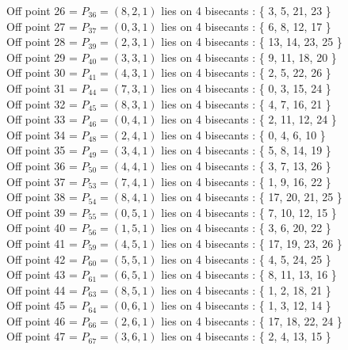 \documentclass{article}
\begin{document}
{Off point 26 = $P_{36} = ( 8, 2, 1 )$ lies on 4 bisecants : \{ 3, 5, 21, 23 \}\\
Off point 27 = $P_{37} = ( 0, 3, 1 )$ lies on 4 bisecants : \{ 6, 8, 12, 17 \}\\
Off point 28 = $P_{39} = ( 2, 3, 1 )$ lies on 4 bisecants : \{ 13, 14, 23, 25 \}\\
Off point 29 = $P_{40} = ( 3, 3, 1 )$ lies on 4 bisecants : \{ 9, 11, 18, 20 \}\\
Off point 30 = $P_{41} = ( 4, 3, 1 )$ lies on 4 bisecants : \{ 2, 5, 22, 26 \}\\
Off point 31 = $P_{44} = ( 7, 3, 1 )$ lies on 4 bisecants : \{ 0, 3, 15, 24 \}\\
Off point 32 = $P_{45} = ( 8, 3, 1 )$ lies on 4 bisecants : \{ 4, 7, 16, 21 \}\\
Off point 33 = $P_{46} = ( 0, 4, 1 )$ lies on 4 bisecants : \{ 2, 11, 12, 24 \}\\
Off point 34 = $P_{48} = ( 2, 4, 1 )$ lies on 4 bisecants : \{ 0, 4, 6, 10 \}\\
Off point 35 = $P_{49} = ( 3, 4, 1 )$ lies on 4 bisecants : \{ 5, 8, 14, 19 \}\\
Off point 36 = $P_{50} = ( 4, 4, 1 )$ lies on 4 bisecants : \{ 3, 7, 13, 26 \}\\
Off point 37 = $P_{53} = ( 7, 4, 1 )$ lies on 4 bisecants : \{ 1, 9, 16, 22 \}\\
Off point 38 = $P_{54} = ( 8, 4, 1 )$ lies on 4 bisecants : \{ 17, 20, 21, 25 \}\\
Off point 39 = $P_{55} = ( 0, 5, 1 )$ lies on 4 bisecants : \{ 7, 10, 12, 15 \}\\
Off point 40 = $P_{56} = ( 1, 5, 1 )$ lies on 4 bisecants : \{ 3, 6, 20, 22 \}\\
Off point 41 = $P_{59} = ( 4, 5, 1 )$ lies on 4 bisecants : \{ 17, 19, 23, 26 \}\\
Off point 42 = $P_{60} = ( 5, 5, 1 )$ lies on 4 bisecants : \{ 4, 5, 24, 25 \}\\
Off point 43 = $P_{61} = ( 6, 5, 1 )$ lies on 4 bisecants : \{ 8, 11, 13, 16 \}\\
Off point 44 = $P_{63} = ( 8, 5, 1 )$ lies on 4 bisecants : \{ 1, 2, 18, 21 \}\\
Off point 45 = $P_{64} = ( 0, 6, 1 )$ lies on 4 bisecants : \{ 1, 3, 12, 14 \}\\
Off point 46 = $P_{66} = ( 2, 6, 1 )$ lies on 4 bisecants : \{ 17, 18, 22, 24 \}\\
Off point 47 = $P_{67} = ( 3, 6, 1 )$ lies on 4 bisecants : \{ 2, 4, 13, 15 \}\\
}
\end{document}
